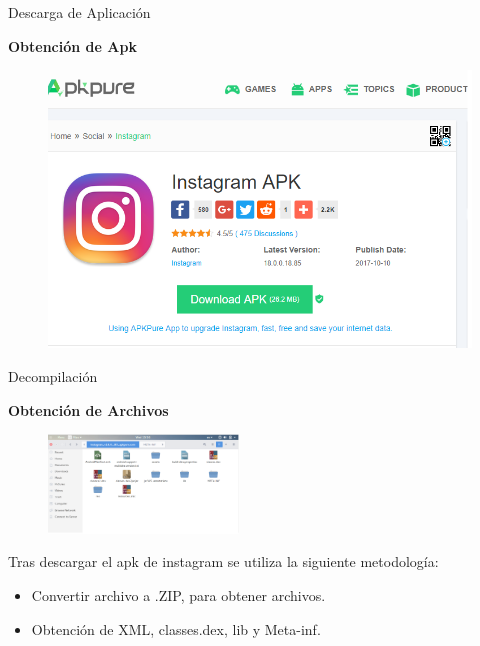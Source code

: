 \begin{frame}[t,fragile]{Descarga de Aplicación}

\textbf{Obtención de Apk}


\begin{figure}[!h]
    \centering
    \includegraphics[scale=0.4]{apkpure.png}
    \label{fig:my_label}
\end{figure}

\end{frame}

\begin{frame}[t,fragile]{Decompilación}

\textbf{Obtención de Archivos}


\begin{figure} 
\vspace{2pt}
  \begin{center}
    \includegraphics[width=0.45\textwidth]{decompiladaapk.png}
    \label{fig:databaseUserTable}
  \end{center}
  \vspace{2pt}
\end{figure} 

\bigskip

Tras descargar el apk de instagram se utiliza la siguiente metodología:

\begin{itemize}
    \item Convertir archivo a .ZIP, para obtener archivos.
    \item Obtención de XML, classes.dex, lib y Meta-inf.
\end{itemize}


\end{frame}




